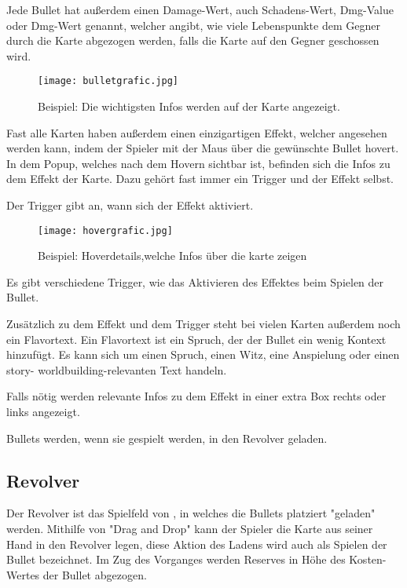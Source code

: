 Jede Bullet hat außerdem einen Damage-Wert, auch Schadens-Wert, Dmg-Value oder Dmg-Wert genannt, welcher angibt, wie viele Lebenspunkte dem Gegner
durch die Karte abgezogen werden, falls die Karte auf den Gegner geschossen wird.

\begin{figure}[H]
    \texttt{[image: bulletgrafic.jpg]}%
    \caption{Beispiel: Die wichtigsten Infos werden auf der Karte angezeigt.}
\end{figure}

Fast alle Karten haben außerdem einen einzigartigen Effekt,
welcher angesehen werden kann, indem der Spieler mit der Maus über die gewünschte Bullet hovert.
In dem Popup, welches nach dem Hovern sichtbar ist, befinden sich die Infos zu dem Effekt der Karte.
Dazu gehört fast immer ein Trigger und der Effekt selbst.


Der Trigger gibt an, wann sich der Effekt aktiviert.


\begin{figure}[H]
    \texttt{[image: hovergrafic.jpg]}
    \caption{Beispiel: Hoverdetails,welche Infos über die karte zeigen}
\end{figure}



Es gibt verschiedene Trigger, wie \zB das Aktivieren des Effektes beim Spielen der Bullet.


Zusätzlich zu dem Effekt und dem Trigger steht bei vielen Karten außerdem noch ein Flavortext.
Ein Flavortext ist ein Spruch, der der Bullet ein wenig Kontext hinzufügt.
Es kann sich um einen Spruch, einen Witz, eine Anspielung oder einen story- \bzw worldbuilding-relevanten Text handeln.


Falls nötig werden relevante Infos zu dem Effekt in einer extra Box rechts oder links angezeigt.


Bullets werden, wenn sie gespielt werden, in den Revolver geladen.


\subsection{Revolver}\label{der_revolver}

Der Revolver ist das Spielfeld von \FF, in welches die Bullets platziert \bzw "geladen" werden.
Mithilfe von "Drag and Drop" kann der Spieler die Karte aus seiner Hand in den Revolver legen, diese Aktion des Ladens wird auch als Spielen der Bullet bezeichnet.
Im Zug des Vorganges werden Reserves in Höhe des Kosten-Wertes der Bullet abgezogen.


